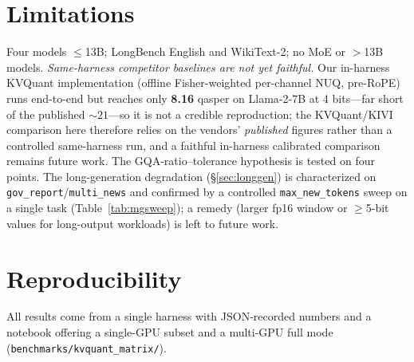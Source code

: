 \documentclass[11pt]{article}
\begin{document}
\section{Limitations}
Four models $\le$13B; LongBench English and WikiText-2; no MoE or $>$13B models.
\emph{Same-harness competitor baselines are not yet faithful.} Our in-harness KVQuant
implementation (offline Fisher-weighted per-channel NUQ, pre-RoPE) runs end-to-end but
reaches only \textbf{8.16} qasper on Llama-2-7B at 4 bits---far short of the published
${\sim}21$---so it is not a credible reproduction; the KVQuant/KIVI comparison here therefore
relies on the vendors' \emph{published} figures rather than a controlled same-harness run, and
a faithful in-harness calibrated comparison remains future work. The GQA-ratio--tolerance
hypothesis is tested on four points. The long-generation
degradation (\S\ref{sec:longgen}) is characterized on \texttt{gov\_report}/\texttt{multi\_news}
and confirmed by a controlled \texttt{max\_new\_tokens} sweep on a single task
(Table~\ref{tab:mgsweep}); a remedy (larger fp16 window or $\ge$5-bit values for long-output
workloads) is left to future work.

\section{Reproducibility}
All results come from a single harness with JSON-recorded numbers and a notebook offering a
single-GPU subset and a multi-GPU full mode (\texttt{benchmarks/kvquant\_matrix/}).
\end{document}
